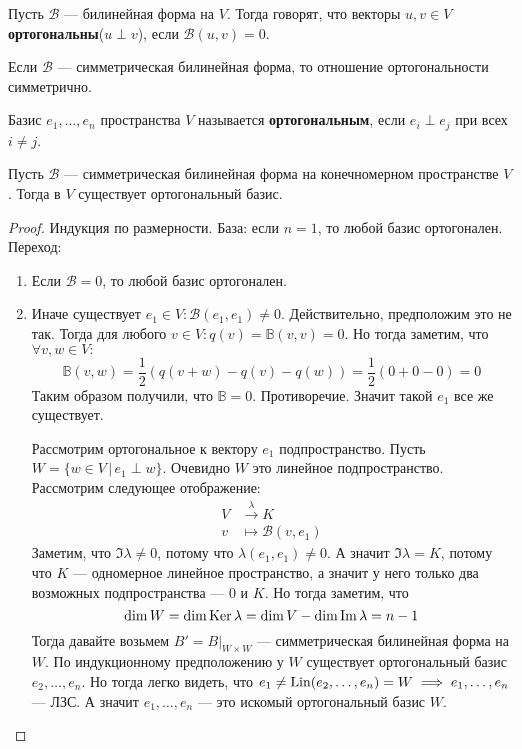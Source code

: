 \documentclass[../main.tex]{subfiles}
\begin{document}
\begin{definition}
  Пусть $\mathcal{B}$ --- билинейная форма на $V$. Тогда говорят, что векторы $u, v \in V$ \textbf{ортогональны}($u \perp v$), если $\mathcal{B}(u, v) = 0$.
\end{definition}

\begin{remark}
  Если $\mathcal{B}$ --- симметрическая билинейная форма, то отношение ортогональности симметрично.
\end{remark}

\begin{definition}
  Базис $e_1, \dotsc, e_n$ пространства $V$ называется \textbf{ортогональным}, если $e_i \perp e_j$ при всех $i \neq j$.
\end{definition}

\begin{theorem}[Лагранжа]
  Пусть $\mathcal{B}$ --- симметрическая билинейная форма на конечномерном пространстве $V$. Тогда в $V$ существует ортогональный базис.
\end{theorem}
\begin{proof}
  Индукция по размерности. База: если $n = 1$, то любой базис ортогонален. Переход:
  \begin{enumerate}
    \item Если $\mathcal{B} = 0$, то любой базис ортогонален.
    \item Иначе существует $e_1 \in V\colon \mathcal{B}(e_1, e_1) \neq 0$. Действительно, предположим это не так. Тогда для любого $v \in V\colon q(v) = \mathbb{B}(v, v) = 0$. Но тогда заметим, что $\forall v, w \in V \colon$
    \begin{equation*}
      \mathbb{B}(v, w) = \frac{1}{2}(q(v + w) - q(v) - q(w)) = \frac{1}{2}(0 + 0 - 0) = 0
    \end{equation*}
    Таким образом получили, что $\mathbb{B} = 0$. Противоречие. Значит такой $e_1$ все же существует.

    Рассмотрим ортогональное к вектору $e_1$ подпространство. Пусть $W = \{w \in V \, | \, e_1 \perp w\}$. Очевидно $W$ это линейное подпространство. Рассмотрим следующее отображение:
    \begin{align*}
      V &\overset{\lambda}{\longrightarrow} K \\
      v &\longmapsto \mathcal{B}(v, e_1)
    \end{align*}
  Заметим, что $\Im \lambda \neq 0$, потому что $\lambda(e_1, e_1) \neq 0$. А значит $\Im \lambda = K$, потому что $K$ --- одномерное линейное пространство, а значит у него только два возможных подпространства --- $0$ и $K$. Но тогда заметим, что
  \begin{equation*}
    \dim W = \dim \operatorname{Ker} \lambda = \dim V - \dim \operatorname{Im} \lambda = n - 1
  \end{equation*}
  Тогда давайте возьмем $B' = B |_{W \times W}$ --- симметрическая билинейная форма на $W$. По индукционному предположению у $W$ существует ортогональный базис $e_2, \dotsc, e_n$. Но тогда легко видеть, что $e_1 \neq \operatorname{Lin}(e_2, \dotsc, e_n) = W \implies e_1, \dotsc, e_n$ --- ЛЗС. А значит $e_1, \dotsc, e_n$ --- это искомый ортогональный базис $W$.
  \end{enumerate}
\end{proof}
\end{document}
